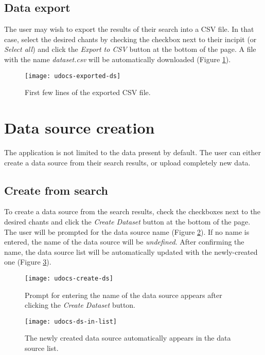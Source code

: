 \subsection{Data export}
\label{section:data_export}

The user may wish to export the results of their search into a CSV file. In that case, select the desired chants by checking the checkbox next to
their incipit (or \emph{Select all}) and click the \emph{Export to CSV} button at the bottom of the page. A file with the name \emph{dataset.csv}
will be automatically downloaded (Figure \ref{fig:export-ex}).

\begin{figure}[!h]
\centering
\texttt{[image: udocs-exported-ds]}
\caption{First few lines of the exported CSV file.}
\label{fig:export-ex}
\end{figure}

\section{Data source creation}

The application is not limited to the data present by default. The user can either create a data source from their search results, or upload
completely new data.

\subsection{Create from search}

To create a data source from the search results, check the checkboxes next to the desired chants and click the \emph{Create Dataset} button at the bottom
of the page. The user will be prompted for the data source name (Figure \ref{fig:create-ds}). If no name is entered, the name of the data source will be
\emph{undefined}. After confirming the name, the data source list will be automatically updated with the newly-created one (Figure \ref{fig:update-ds-antiphons}).

\begin{figure}[!h]
\centering
\texttt{[image: udocs-create-ds]}
\caption{Prompt for entering the name of the data source appears after clicking the \emph{Create Dataset} button.}
\label{fig:create-ds}
\end{figure}

\begin{figure}[!h]
\centering
\texttt{[image: udocs-ds-in-list]}
\caption{The newly created data source automatically appears in the data source list.}
\label{fig:update-ds-antiphons}
\end{figure}

